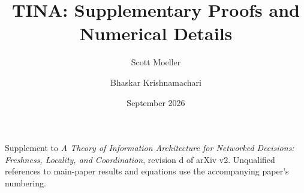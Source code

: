 \documentclass[11pt]{article}
\begin{document}
\title{TINA: Supplementary Proofs and Numerical Details}
\author{Scott Moeller \and Bhaskar Krishnamachari}
\date{September 2026}
\maketitle
\noindent Supplement to \emph{A Theory of Information Architecture for Networked
Decisions: Freshness, Locality, and Coordination}, revision d of arXiv v2.
Unqualified references to main-paper results and equations use the accompanying paper's numbering.


\end{document}
